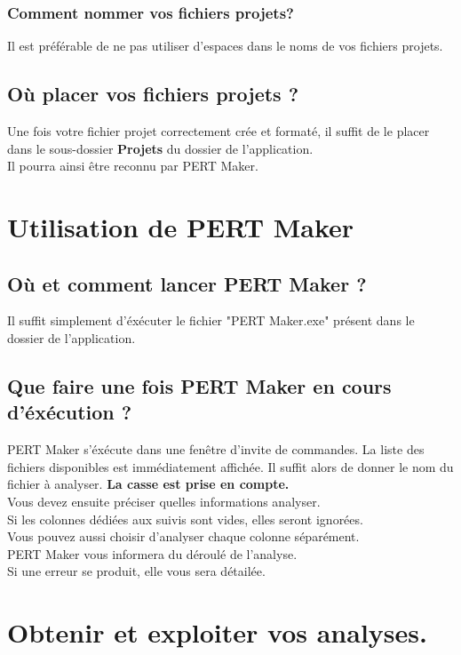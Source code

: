 \documentclass{article}
\begin{document}
\subsubsection{Comment nommer vos fichiers projets?}
Il est préférable de ne pas utiliser d'espaces dans le noms de vos fichiers projets.\\

\subsection{Où placer vos fichiers projets ?}
Une fois votre fichier projet correctement crée et formaté, il suffit de le placer dans
le sous-dossier \textbf{Projets} du dossier de l'application. \\ Il pourra ainsi être reconnu
par PERT Maker. \\


\section{Utilisation de PERT Maker}
\subsection{Où et comment lancer PERT Maker ?}
Il suffit simplement d'éxécuter le fichier "PERT Maker.exe" présent dans le dossier de l'application.
\subsection{Que faire une fois PERT Maker en cours d'éxécution ?}
PERT Maker s'éxécute dans une fenêtre d'invite de commandes.
La liste des fichiers disponibles est immédiatement affichée.
Il suffit alors de donner le nom du fichier à analyser. \textbf{La casse est prise en compte.}\\
Vous devez ensuite préciser quelles informations analyser.\\
Si les colonnes dédiées aux suivis sont vides, elles seront ignorées.\\
Vous pouvez aussi choisir d'analyser chaque colonne séparément.\\
PERT Maker vous informera du déroulé de l'analyse.\\
Si une erreur se produit, elle vous sera détailée.

\section{Obtenir et exploiter vos analyses.}
\end{document}
